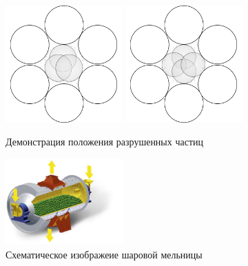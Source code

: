 \documentclass[c]{beamer}  %
\begin{document}
\begin{frame}
\frametitle{\insertsection} 
\framesubtitle{\insertsubsection}
\begin{figure}[h!]
	\centering
	\includegraphics[width=0.4\textwidth]{3_balls}
	\includegraphics[width=0.4\textwidth]{4_balls}
	\caption{Демонстрация положения разрушенных частиц}
\end{figure} 
\end{frame}



\begin{frame}
\begin{figure}[H]
	\centering
	\includegraphics[width=0.4\textwidth]{mill_end} 
	\caption{Схематическое изображеие шаровой мельницы}
	\label{pic:mill_end}
\end{figure} 

\end{frame}
\end{document}
